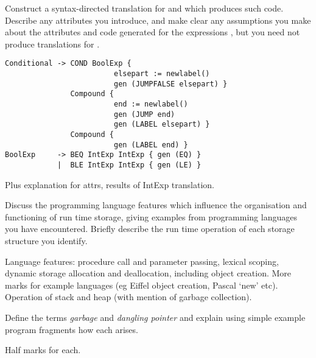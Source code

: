 \begin{questions}
\begin{subquestions}
\begin{subsubquestions}
\subsubquestion
        Construct a syntax-directed translation for 
         and  which produces such code.
        Describe any attributes you
        introduce, and make clear any assumptions you make about 
        the attributes and code generated for the
        expressions , but you need not produce translations for
	.
\begin{modelanswer}
\begin{verbatim}
Conditional -> COND BoolExp { 
                         elsepart := newlabel()
                         gen (JUMPFALSE elsepart) }
               Compound {
                         end := newlabel()
                         gen (JUMP end)
                         gen (LABEL elsepart) }
               Compound {
                         gen (LABEL end) }
BoolExp     -> BEQ IntExp IntExp { gen (EQ) }
            |  BLE IntExp IntExp { gen (LE) }
\end{verbatim}
Plus explanation for attrs, results of IntExp translation.
\end{modelanswer}
\end{subsubquestions}

\end{subquestions}

\question

\begin{subquestions}
\subquestion
Discuss the programming language features which influence
the organisation and functioning of run time storage,
giving examples from programming languages you
have encountered.  Briefly describe the run time operation of
each storage structure you identify.
\begin{modelanswer}
Language features: procedure call and parameter passing, 
lexical scoping, dynamic storage allocation and deallocation, 
including object creation. More marks for example languages
(eg Eiffel object creation, Pascal `new' etc). Operation of 
stack and heap (with mention of garbage collection).
\end{modelanswer}

\subquestion
Define the terms {\em garbage\/} and {\em dangling pointer} 
and explain using simple example program fragments 
how each arises.
\begin{modelanswer}
Half marks for each.
\end{modelanswer}


\end{subquestions}
\end{questions}
